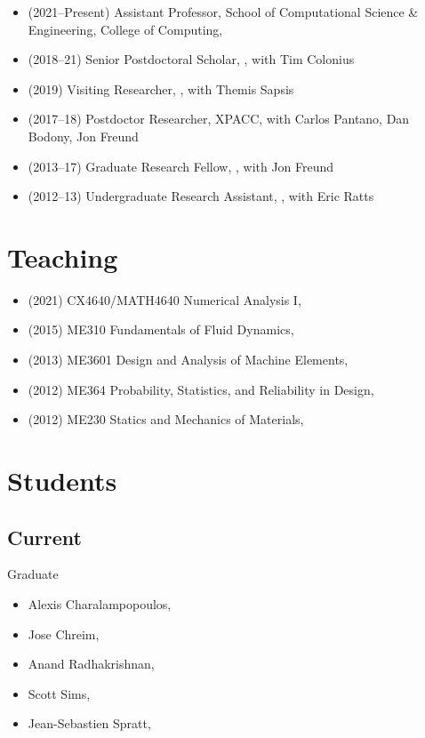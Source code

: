 \begin{itemize}
    \item (2021--Present) Assistant Professor, School of Computational Science \& Engineering, College of Computing, \GIT
    \item (2018--21) Senior Postdoctoral Scholar, \CIT, with Tim Colonius
    \item (2019) Visiting Researcher, \MIT, with Themis Sapsis
    \item (2017--18) Postdoctor Researcher, XPACC, with Carlos Pantano, Dan Bodony, Jon Freund
    \item (2013--17) Graduate Research Fellow, \UIUC, with Jon Freund
    \item (2012--13) Undergraduate Research Assistant, \UMD, with Eric Ratts
\end{itemize}

\section{Teaching}

\begin{itemize}
    \item (2021) CX4640/MATH4640 Numerical Analysis I, \GIT
    \item (2015) ME310 Fundamentals of Fluid Dynamics, \UIUC
    \item (2013) ME3601 Design and Analysis of Machine Elements, \UMD
    \item (2012) ME364 Probability, Statistics, and Reliability in Design, \UMD
    \item (2012) ME230 Statics and Mechanics of Materials, \UMD
\end{itemize}


\section{Students}

\subsection{Current}

Graduate
\begin{itemize}
    \item Alexis Charalampopoulos, \MIT
    \item Jose Chreim, \CIT
    \item Anand Radhakrishnan, \GIT
    \item Scott Sims, \GIT
    \item Jean-Sebastien Spratt, \CIT
\end{itemize}

